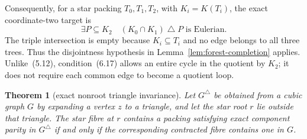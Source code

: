 \documentclass[11pt]{article}
\newtheorem{theorem}{Theorem}[section]
\theoremstyle{definition}
\theoremstyle{remark}
\newcommand{\symdiff}{\mathbin{\triangle}}
\newcommand{\1}{\mathbf 1}
\begin{document}
Consequently, for a star packing \(T_0,T_1,T_2\), with
\(K_i=K(T_i)\), the exact coordinate-two target is
\[
 \exists P\subseteq K_2\quad
       (K_0\cap K_1)\symdiff P\text{ is Eulerian}.        \tag{6.17}
\]
The triple intersection is empty because \(K_i\subseteq T_i\) and no edge
belongs to all three trees.  Thus the disjointness hypothesis in
Lemma~\ref{lem:forest-completion} applies.  Unlike~(5.12), condition~(6.17)
allows an entire cycle in the quotient by \(K_2\); it does not require
each common edge to become a quotient loop.

\begin{theorem}[exact nonroot triangle invariance]
\label{thm:triangle-exact}
Let \(G^\triangle\) be obtained from a cubic graph \(G\) by expanding a
vertex \(z\) to a triangle, and let the star root \(r\) lie outside that
triangle.  The star fibre at \(r\) contains a packing satisfying exact
component parity in \(G^\triangle\) if and only if the corresponding
contracted fibre contains one in \(G\).
\end{theorem}
\end{document}
